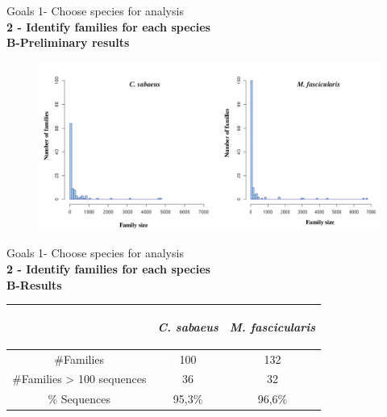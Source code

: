 \documentclass[11pt]{beamer}
\begin{document}
\begin{frame}{Goals}
	1- Choose species for analysis \\ \medbreak
	\textbf{2 - Identify families for each species } \\ \medbreak
	\textbf{B-Preliminary results}	
	\begin{figure}
		\includegraphics[width=\textwidth]{img/FamSize_NumFam2.png}
	\end{figure}	
\end{frame}

\begin{frame}{Goals}
	1- Choose species for analysis \\ \medbreak
	\textbf{2 - Identify families for each species } \\ \medbreak
	\textbf{B-Results}

\begin{center}
			\medbreak						
			\begin{tabular}{|c|c|c|}
			\hline
			\begin{bf}\end{bf} & \begin{bf}\textit{C. sabaeus}\end{bf} & \begin{bf}\textit{M. fascicularis}\end{bf}\\
			\hline
			\#Families & 100 & 132\\
			\hline
			\#Families > 100 sequences  & 36 & 32 \\
			\hline
			\% Sequences  & 95,3\% & 96,6\% \\
			\hline
			\end{tabular}			
		\end{center}
\end{frame}
\end{document}
